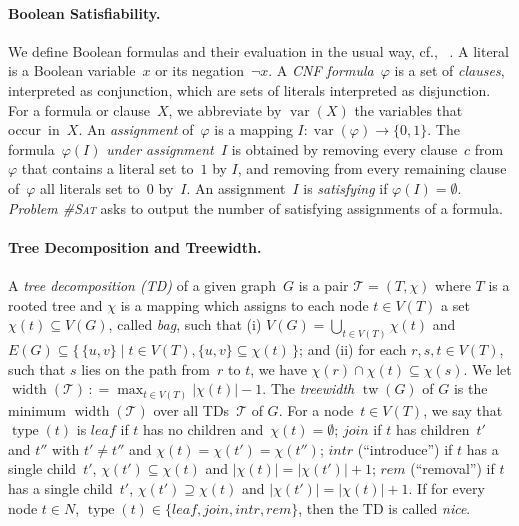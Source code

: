 \documentclass{llncs}
\newcommand{\longversion}[1]{#1}
\newcommand{\SB}{\{\,}%
\newcommand{\SM}{\;{|}\;}%
\newcommand{\SE}{\,\}}%
\newcommand{\eqdef}{\ensuremath{\,\mathrel{\mathop:}=}}
\newcommand{\TTT}{\mathcal{T}}
\newcommand{\Card}[1]{|#1|}
\newcommand{\cSAT}{\textsc{\#Sat}\xspace}%
\DeclareMathOperator{\tw}{tw}
\DeclareMathOperator{\width}{width}
\DeclareMathOperator{\var}{var}
\DeclareMathOperator{\type}{type}
\newcommand{\intr}{\textit{intr}}
\newcommand{\leaf}{\textit{leaf}}
\newcommand{\rem}{\textit{rem}}
\newcommand{\join}{\textit{join}}
\begin{document}
\paragraph*{Boolean Satisfiability.}
  We define Boolean formulas and their evaluation in the usual
  way, cf., ~\cite{GomesKautzSabharwalSelman08a,KleineBuningLettman99}.
  A literal is a Boolean variable~$x$ or its negation~$\neg
  x$.
  A \emph{CNF formula}~$\varphi$ is a set of \emph{clauses}, interpreted as conjunction, which are sets of literals
  interpreted as disjunction. For a formula or clause~$X$, we
  abbreviate by $\var(X)$ the variables that occur~in~$X$.
%
%
%
%
%
%
%
%
%
An \emph{assignment} of~$\varphi$ is a mapping
$I: \var(\varphi) \rightarrow \{0,1\}$.
%
%
%
%
%
%
%
The formula~$\varphi(I)$ \emph{under assignment~$I$} is obtained
by removing every clause~$c$ from $\varphi$ that contains a literal set to~$1$
by $I$, and removing from every remaining clause of~$\varphi$ all literals set
to~$0$ by~$I$. An assignment~$I$ is \emph{satisfying} if
$\varphi(I)=\emptyset$.
%
\emph{Problem \cSAT} asks to output the number of satisfying assignments
of a formula.
%
%
%
%
%
%
%
%
%
%
%
%
%
%
%
%
%
%
%
%
%
%



%

%
\paragraph*{Tree Decomposition and Treewidth.} %
%
A \emph{tree decomposition (TD)} of a given graph~$G$ is a pair
$\TTT=(T,\chi)$ where $T$ is a rooted tree and $\chi$ is a mapping
which assigns to each node $t\in V(T)$ a set~$\chi(t)\subseteq V(G)$,
called \emph{bag}, such that (i) $V(G)=\bigcup_{t\in V(T)}\chi(t)$
and
$E(G)\subseteq\SB \{u,v\} \SM t\in V(T), \{u,v\}\subseteq \chi(t)\SE$;
and (ii) for each $r, s, t\in V(T)$, such that $s$ lies on the path
from~$r$ to $t$, we have $\chi(r) \cap \chi(t) \subseteq \chi(s)$. We
let $\width(\TTT) \eqdef \max_{t\in V(T)}\Card{\chi(t)}-1$.
%
The
\emph{treewidth} $\tw(G)$ of $G$ is the minimum $\width({\TTT})$ over
all TDs~$\TTT$ of $G$.
%
For a node~$t \in V(T)$, we say that $\type(t)$ is $\leaf$ if $t$ has
no children and~$\chi(t)=\emptyset$; $\join$ if $t$ has children~$t'$ and $t''$ with
$t'\neq t''$ and $\chi(t) = \chi(t') = \chi(t'')$; $\intr$
(``introduce'') if $t$ has a single child~$t'$,
$\chi(t') \subseteq \chi(t)$ and $|\chi(t)| = |\chi(t')| + 1$; $\rem$
(``removal'') if $t$ has a single child~$t'$,
$\chi(t') \supseteq \chi(t)$ and $|\chi(t')| = |\chi(t)| + 1$. If for
every node $t\in N$, %
$\type(t) \in \{ \leaf, \join, \intr, \rem\}$, then the TD is called \emph{nice}.
%
%
%
%
%
\end{document}
